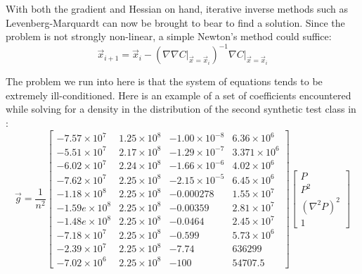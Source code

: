With both the gradient and Hessian on hand, 
iterative inverse methods such
as Levenberg-Marquardt can now be brought to bear to find a solution.
Since the problem is not strongly non-linear, a simple Newton's method
could suffice:
\begin{equation}
\vec x_{i+1} = \vec x_i - \left ( \nabla \nabla C |_{\vec x=\vec x_i} \right )^{-1}
		\nabla C |_{\vec x=\vec x_i}
\end{equation}

The problem we run into here is that the system of equations 
tends to be extremely ill-conditioned.  Here is an example of a set of 
coefficients encountered while solving for a density in the distribution
of the second synthetic test class in \citet{Mills2011}:
\begin{equation}
\vec g = \frac{1}{n^2}
\begin{bmatrix}
-7.57\times10^7 & 1.25\times10^8 & -1.00\times10^{-8} & 6.36\times10^6 \\
-5.51\times10^7 & 2.17\times10^8 & -1.29\times10^{-7} & 3.371\times10^6 \\
-6.02\times10^7 & 2.24\times10^8 & -1.66\times10^{-6} & 4.02\times10^6 \\
-7.62\times10^7 & 2.25\times10^8 & -2.15\times10^{-5} & 6.45\times10^6 \\
-1.18\times10^8 & 2.25\times10^8 & -0.000278 & 1.55\times10^7 \\
-1.59e\times10^8 & 2.25\times10^8 & -0.00359 & 2.81\times10^7 \\
-1.48e\times10^8 & 2.25\times10^8 & -0.0464 & 2.45\times10^7 \\
-7.18\times10^7 & 2.25\times10^8 & -0.599 & 5.73\times10^6 \\
-2.39\times10^7 & 2.25\times10^8 & -7.74 & 636299 \\
-7.02\times10^6 & 2.25\times10^8 & -100 & 54707.5
\end{bmatrix}
\begin{bmatrix}
P \\ P^2 \\ (\nabla^2 P)^2 \\ 1
\end{bmatrix}
\end{equation}

%

%

